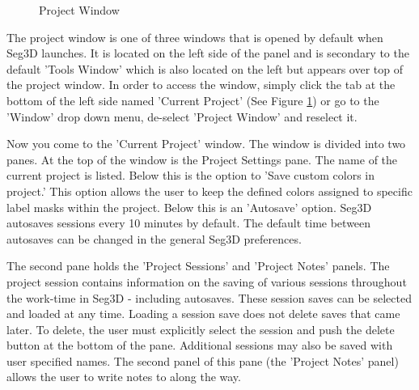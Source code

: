 \documentclass[fleqn,11pt,openany]{book}
\begin{document}
\begin{figure}
\caption{Project Window}\label{fig:ProjectWindow}
\end{figure}
The project window is one of three windows that is opened by default when Seg3D launches.  
It is located on the left side of the panel and is secondary to the default 'Tools Window' which is also 
located on the left but appears over top of the project window.  
In order to access the window, simply click the tab at the bottom of the left side named 'Current Project' (See Figure \ref{fig:ProjectWindow}) or go to the 'Window' drop down menu, de-select 
'Project Window' and reselect it.

Now you come to the 'Current Project' window.  
The window is divided into two panes.  
At the top of the window is the Project Settings pane.  
The name of the current project is listed.  
Below this is the option to 'Save custom colors in project.'  
This option allows the user to keep the defined colors assigned to specific label masks within the project.  
Below this is an 'Autosave' option. Seg3D autosaves sessions every 10 minutes by default.  
The default time between autosaves can be changed in the general Seg3D preferences.

The second pane holds the 'Project Sessions' and 'Project Notes' panels.  
The project session contains information on the saving of various sessions throughout the work-time in Seg3D - including autosaves.  
These session saves can be selected and loaded at any time.  
Loading a session save does not delete saves that came later.  
To delete, the user must explicitly select the session and push the delete button at the bottom of the pane.  
Additional sessions may also be saved with user specified names.  
The second panel of this pane (the 'Project Notes' panel) allows the user to write notes to along the way.
\end{document}
